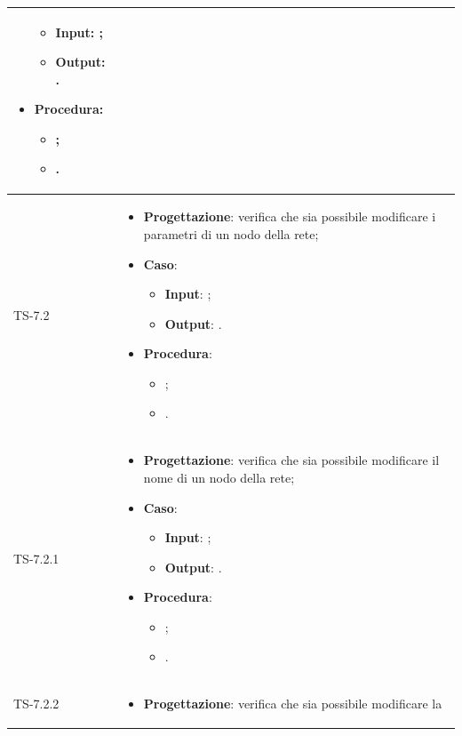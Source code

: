 \begin{longtable}{|C{2.5cm}|C{13cm}|}
\begin{itemize}
	\begin{itemize}
		\item \textbf{Input}: ;
		\item \textbf{Output}: .
	\end{itemize}
	\item \textbf{Procedura}:
	\begin{itemize}
		\item ;
		\item .
	\end{itemize} 
\end{itemize}
	  \\
	\hline
	{TS-7.2} &
\begin{itemize}
	\item \textbf{Progettazione}: verifica che sia possibile modificare i
	parametri di un nodo della rete;
	\item \textbf{Caso}: 
	\begin{itemize}
		\item \textbf{Input}: ;
		\item \textbf{Output}: .
	\end{itemize}
	\item \textbf{Procedura}:
	\begin{itemize}
		\item ;
		\item .
	\end{itemize} 
\end{itemize}
	 \\
	\hline
	{TS-7.2.1} & 
\begin{itemize}
	\item \textbf{Progettazione}: verifica che sia  possibile modificare il
	nome di un nodo della rete;
	\item \textbf{Caso}: 
	\begin{itemize}
		\item \textbf{Input}: ;
		\item \textbf{Output}: .
	\end{itemize}
	\item \textbf{Procedura}:
	\begin{itemize}
		\item ;
		\item .
	\end{itemize} 
\end{itemize}
	 \\
	\hline
	{TS-7.2.2} & 
\begin{itemize}
	\item \textbf{Progettazione}: verifica che sia possibile modificare la

\end{itemize}
\end{longtable}
